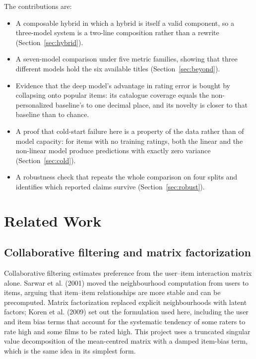 \documentclass[10pt,twocolumn,letterpaper]{article}
\begin{document}
\noindent The contributions are:

\begin{itemize}\itemsep2pt
\item A composable hybrid in which a hybrid is itself a valid component, so a
      three-model system is a two-line composition rather than a rewrite
      (Section~\ref{sec:hybrid}).
\item A seven-model comparison under five metric families, showing that three
      different models hold the six available titles
      (Section~\ref{sec:beyond}).
\item Evidence that the deep model's advantage in rating error is bought by
      collapsing onto popular items: its catalogue coverage equals the
      non-personalized baseline's to one decimal place, and its novelty is
      closer to that baseline than to chance.
\item A proof that cold-start failure here is a property of the data rather
      than of model capacity: for items with no training ratings, both the
      linear and the non-linear model produce predictions with exactly zero
      variance (Section~\ref{sec:cold}).
\item A robustness check that repeats the whole comparison on four splits and
      identifies which reported claims survive (Section~\ref{sec:robust}).
\end{itemize}

\section{Related Work}

\subsection{Collaborative filtering and matrix factorization}
Collaborative filtering estimates preference from the user--item interaction
matrix alone. Sarwar et al. (2001) moved the neighbourhood computation from
users to items, arguing that item--item relationships are more stable and can
be precomputed. Matrix factorization replaced explicit neighbourhoods with
latent factors; Koren et al. (2009) set out the formulation used here,
including the user and item bias terms that account for the systematic
tendency of some raters to rate high and some films to be rated high. This
project uses a truncated singular value decomposition of the mean-centred
matrix with a damped item-bias term, which is the same idea in its simplest
form.
\end{document}
